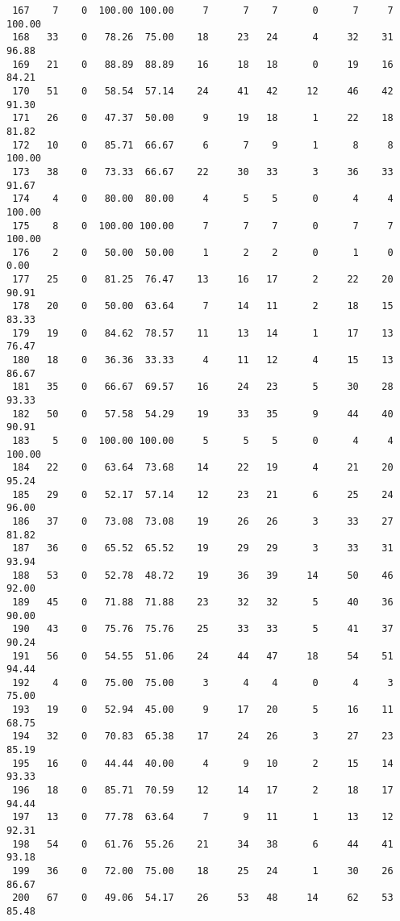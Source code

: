 \begin{verbatim}
 167    7    0  100.00 100.00     7      7    7      0      7     7   100.00
 168   33    0   78.26  75.00    18     23   24      4     32    31    96.88
 169   21    0   88.89  88.89    16     18   18      0     19    16    84.21
 170   51    0   58.54  57.14    24     41   42     12     46    42    91.30
 171   26    0   47.37  50.00     9     19   18      1     22    18    81.82
 172   10    0   85.71  66.67     6      7    9      1      8     8   100.00
 173   38    0   73.33  66.67    22     30   33      3     36    33    91.67
 174    4    0   80.00  80.00     4      5    5      0      4     4   100.00
 175    8    0  100.00 100.00     7      7    7      0      7     7   100.00
 176    2    0   50.00  50.00     1      2    2      0      1     0     0.00
 177   25    0   81.25  76.47    13     16   17      2     22    20    90.91
 178   20    0   50.00  63.64     7     14   11      2     18    15    83.33
 179   19    0   84.62  78.57    11     13   14      1     17    13    76.47
 180   18    0   36.36  33.33     4     11   12      4     15    13    86.67
 181   35    0   66.67  69.57    16     24   23      5     30    28    93.33
 182   50    0   57.58  54.29    19     33   35      9     44    40    90.91
 183    5    0  100.00 100.00     5      5    5      0      4     4   100.00
 184   22    0   63.64  73.68    14     22   19      4     21    20    95.24
 185   29    0   52.17  57.14    12     23   21      6     25    24    96.00
 186   37    0   73.08  73.08    19     26   26      3     33    27    81.82
 187   36    0   65.52  65.52    19     29   29      3     33    31    93.94
 188   53    0   52.78  48.72    19     36   39     14     50    46    92.00
 189   45    0   71.88  71.88    23     32   32      5     40    36    90.00
 190   43    0   75.76  75.76    25     33   33      5     41    37    90.24
 191   56    0   54.55  51.06    24     44   47     18     54    51    94.44
 192    4    0   75.00  75.00     3      4    4      0      4     3    75.00
 193   19    0   52.94  45.00     9     17   20      5     16    11    68.75
 194   32    0   70.83  65.38    17     24   26      3     27    23    85.19
 195   16    0   44.44  40.00     4      9   10      2     15    14    93.33
 196   18    0   85.71  70.59    12     14   17      2     18    17    94.44
 197   13    0   77.78  63.64     7      9   11      1     13    12    92.31
 198   54    0   61.76  55.26    21     34   38      6     44    41    93.18
 199   36    0   72.00  75.00    18     25   24      1     30    26    86.67
 200   67    0   49.06  54.17    26     53   48     14     62    53    85.48

\end{verbatim}
